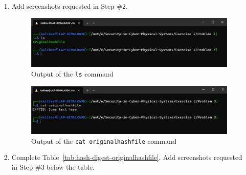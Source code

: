 \documentclass[11pt,letterpaper]{article}
\newenvironment{answer}{\em \color{blue} \begin{adjustwidth}{1cm}{1cm}}{\end{adjustwidth}}
\begin{document}
	\begin{enumerate}
		
		\item Add screenshots requested in Step \#2.
		
		\begin{answer}
			\begin{figure}[H]
				\centering
				\includegraphics[width=0.7\columnwidth]{images/p3/s1}
				\caption{Output of the {\tt ls} command} \label{fig:pa-ls}
			\end{figure}
		
			\begin{figure}[H]
				\centering
				\includegraphics[width=0.7\columnwidth]{images/p3/s2}
				\caption{Output of the {\tt cat originalhashfile} command} \label{fig:pa-cat}
			\end{figure}
		\end{answer}
		

		
		\item Complete Table~\ref{tab:hash-digest-originalhashfile}. Add screenshots requested in Step \#3 below the table.
		
				
				
				

\end{enumerate}
\end{document}
